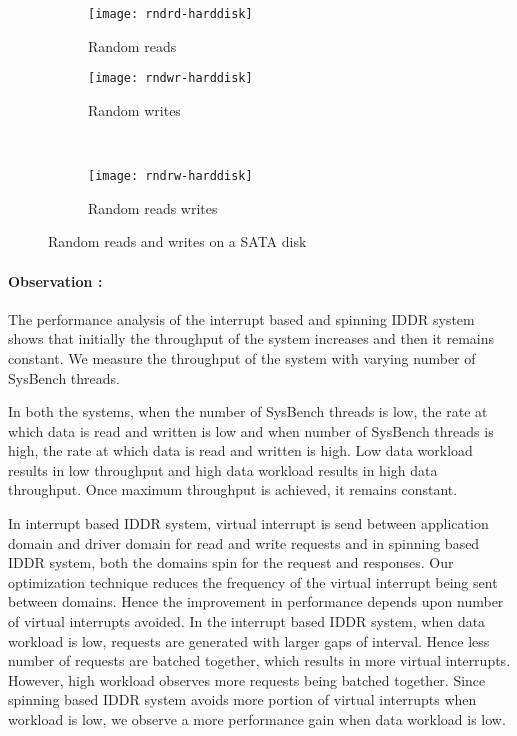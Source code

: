 \begin{figure}[!ht]
  \begin{subfigure}[b]{0.2\textwidth}
  \texttt{[image: rndrd-harddisk]}
  \caption{Random reads}
  \label{subfig:rndrd-harddisk}
  \end{subfigure}
  \hspace{50mm}
  \begin{subfigure}[b]{0.2\textwidth}
  \texttt{[image: rndwr-harddisk]}
  \caption{Random writes}
  \label{subfig:rndwr-harddisk}
  \end{subfigure}\\
  \begin{subfigure}[b]{0.3\textwidth}
  \texttt{[image: rndrw-harddisk]}
  \caption{Random reads writes}
  \label{subfig:rndrw-harddisk}
  \end{subfigure}
\caption{Random reads and writes on a SATA disk}\label{fig:rndharddisk}
\end{figure}


\paragraph{Observation :}
The performance analysis of the interrupt based and spinning IDDR system shows that initially the throughput of the system increases and then it remains constant. We measure the throughput of the system with varying number of SysBench threads. 

In both the systems, when the number of SysBench threads is low, the rate at which data is read and written is low and when number of SysBench threads is high, the rate at which data is read and written is high. Low data workload results in low throughput and high data workload results in high data throughput. Once maximum throughput is achieved, it remains constant.

In interrupt based IDDR system, virtual interrupt is send between application domain and driver domain for read and write requests and in spinning based IDDR system, both the domains spin for the request and responses. Our optimization technique reduces the frequency of the virtual interrupt being sent between domains. Hence the improvement in performance depends upon number of virtual interrupts avoided. In the interrupt based IDDR system, when data workload is low, requests are generated with larger gaps of interval. Hence less number of requests are batched together, which results in more virtual interrupts. However, high workload observes more requests being batched together. Since spinning based IDDR system avoids more portion of virtual interrupts when workload is low, we observe a more performance gain when data workload is low. 

